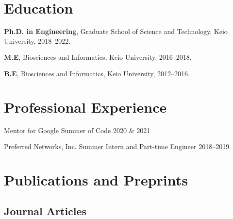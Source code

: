\documentclass[letterpaper]{article}
\renewenvironment{itemize}{
  \begin{list}{}{
    \setlength{\leftmargin}{1.5em}
  }
}{
  \end{list}
}
\begin{document}
\section*{\bf Education}
\vspace{-0.6cm}
\hrulefill

\begin{itemize}
 \item {\bf Ph.D. in Engineering}, Graduate School of Science and Technology, Keio University, 2018--2022.
 \item {\bf M.E}, Biosciences and Informatics, Keio University, 2016--2018.
 \item {\bf B.E}, Biosciences and Informatics, Keio University, 2012--2016.
       \\
\end{itemize}


\section*{\bf Professional Experience}
\vspace{-0.6cm}
\hrulefill

\begin{itemize}
 \item Mentor for Google Summer of Code 2020 \& 2021
 \item Preferred Networks, Inc. Summer Intern and Part-time Engineer 2018--2019
       \\
\end{itemize}


\section*{\bf Publications and Preprints}
\vspace{-0.6cm}
\hrulefill
\vspace{-0.3cm}

\subsection*{\bf Journal Articles}
\end{document}
